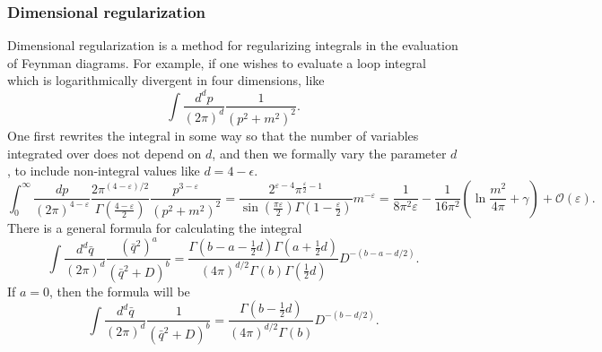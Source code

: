 \subsubsection{Dimensional regularization}
Dimensional regularization is a method for regularizing integrals in the evaluation of Feynman diagrams. For example, if one wishes to evaluate a loop integral which is logarithmically divergent in four dimensions, like
\[\int {\frac {d^{d}p}{(2\pi )^{d}}}{\frac {1}{\left(p^{2}+m^{2}\right)^{2}}}.\]
One first rewrites the integral in some way so that the number of variables integrated over does not depend on $d$, and then we formally vary the parameter $d$, to include non-integral values like $d=4-\epsilon$.
\[\int _{0}^{\infty }{\frac {dp}{(2\pi )^{4-\varepsilon }}}{\frac {2\pi ^{(4-\varepsilon )/2}}{\Gamma \left({\frac {4-\varepsilon }{2}}\right)}}{\frac {p^{3-\varepsilon }}{\left(p^{2}+m^{2}\right)^{2}}}={\frac {2^{\varepsilon -4}\pi ^{{\frac {\varepsilon }{2}}-1}}{\sin({\frac {\pi \varepsilon }{2}})\Gamma (1-{\frac {\varepsilon }{2}})}}m^{-\varepsilon }={\frac {1}{8\pi ^{2}\varepsilon }}-{\frac {1}{16\pi ^{2}}}\left(\ln {\frac {m^{2}}{4\pi }}+\gamma \right)+{\mathcal {O}}(\varepsilon ).\]
There is a general formula for calculating the integral
\[\int \frac{d^d \bar{q}}{(2\pi)^{d}} \frac{(\bar{q}^2)^a}{(\bar{q}^2+D)^b} = \frac{\Gamma(b-a-\frac{1}{2}d) \Gamma(a+\frac{1}{2}d)}{(4\pi)^{d/2} \Gamma(b) \Gamma(\frac{1}{2}d)} D^{-(b-a-d/2)}.\]
If $a=0$, then the formula will be
\[\int \frac{d^d \bar{q}}{(2\pi)^{d}} \frac{1}{(\bar{q}^2+D)^b} = \frac{\Gamma(b-\frac{1}{2}d)}{(4\pi)^{d/2} \Gamma(b)} D^{-(b-d/2)}.\]

